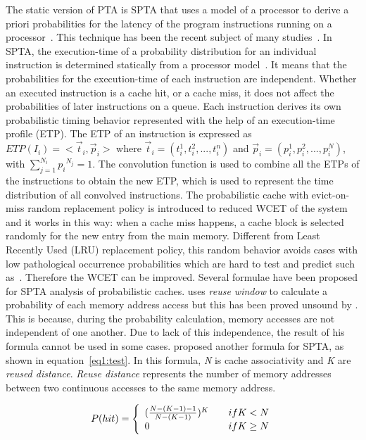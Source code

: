 The static version of PTA is SPTA that uses a model of a processor to derive a priori probabilities for the latency of the program instructions running on a processor~\cite{bernat2002wcet}. This technique has been the recent subject of many studies~\cite{Cazorla:2013:PPA:2465787.2465796, davis2013analysis, altmeyer2014correctness, bernat2002wcet}. In SPTA, the execution-time of a probability distribution for an individual instruction is determined statically from a processor model~\cite{Kosmidis:2013:CDP:2485288.2485416}. It means that the probabilities for the execution-time of each instruction are independent. Whether an executed instruction is a cache hit, or a cache miss, it does not affect the probabilities of later instructions on a queue. Each instruction derives its own probabilistic timing behavior represented with the help of an execution-time profile (ETP). The ETP of an instruction is expressed as $ETP(I_i)=<\vec{t}_i, \vec{p}_i>$
where $\vec{t}_i=(t^1_i, t^2_i,...,t^n_i )$ and $\vec{p}_i=(p^1_i, p^2_i,...,p^N_i)$, with  $\sum^{N{_i}}_{j=1}{p_i}^{N_j} = 1$. The convolution function is used to combine all the ETPs of the instructions to obtain the new ETP, which is used to represent the time distribution of all convolved instructions. The probabilistic cache with evict-on-miss random replacement policy is introduced
to reduced WCET of the system and it works in this way: when a cache miss
happens, a cache block is selected randomly for the new entry from the main
memory. Different from Least Recently Used (LRU) replacement policy, this random
behavior avoids cases with low pathological occurrence probabilities which are
hard to test and predict such as~\cite{Cazorla:2013:PPA:2465787.2465796}. Therefore the
WCET can be improved.
Several formulae have been proposed for SPTA analysis of probabilistic caches.
\cite{zhou:spta} uses \textit{reuse window} to calculate a probability of each
memory address access but this has been proved unsound by \cite{Cazorla:2013:PPA:2465787.2465796}. This is because, during the probability calculation, memory
accesses are not independent of one another. Due to lack of this independence,
the result of his formula cannot be used in some cases. \cite{Cazorla:2013:PPA:2465787.2465796} proposed another formula for SPTA, as shown
in equation~\eqref{eq1:test}. In this formula, \textit{N} is cache associativity and \textit{K} are
\textit{reused distance}. \textit{Reuse distance} represents the number of memory
addresses between two continuous accesses to the same memory address.


\begin{equation}\label{eq1:test}
P(hit) = \left\{
\begin{array}{l l}
(\frac{N-(K-1)-1}{N-(K-1)})^K & \quad if K<N\\
0 & \quad if K\geq N\\
\end{array}
\right.
\end{equation}

